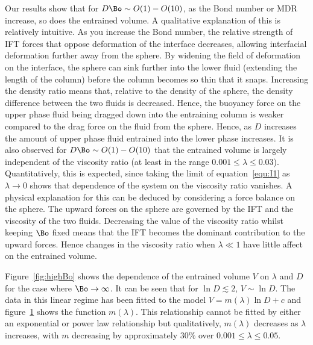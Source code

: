 {Our results show that for $D \Bo \sim O(1) - O(10)$, as the Bond number or MDR increase, so does the entrained volume. A qualitative explanation of this is relatively intuitive. As you increase the Bond number, the relative strength of IFT forces that oppose deformation of the interface decreases, allowing interfacial deformation further away from the sphere. By widening the field of deformation on the interface, the sphere can sink further into the lower fluid (extending the length of the column) before the column becomes so thin that it snaps. Increasing the density ratio means that, relative to the density of the sphere, the density difference between the two fluids is decreased. Hence, the buoyancy force on the upper phase fluid being dragged down into the entraining column is weaker compared to the drag force on the fluid from the sphere. Hence, as $D$ increases the amount of upper phase fluid entrained into the lower phase increases. It is also observed for $D \Bo \sim O(1) - O(10)$ that the entrained volume is largely independent of the viscosity ratio (at least in the range $0.001 \leq \lambda \leq 0.03$). Quantitatively, this is expected, since taking the limit of equation~\ref{equ:I1} as $\lambda \to 0$ shows that dependence of the system on the viscosity ratio vanishes. A physical explanation for this can be deduced by considering a force balance on the sphere. The upward forces on the sphere are governed by the IFT and the viscosity of the two fluids. Decreasing the value of the viscosity ratio whilst keeping $\Bo$ fixed means that the IFT becomes the dominant contribution to the upward forces. Hence changes in the viscosity ratio when $\lambda \ll 1$ have little affect on the entrained volume. 

Figure~\ref{fig:highBo} shows the dependence of the entrained volume $V$ on $\lambda$ and $D$ for the case where $\Bo \to \infty$. It can be seen that for $\ln D \lesssim 2$, $V \sim \ln D$. The data in this linear regime has been fitted to the model $V = m(\lambda) \ln D + c$ and figure~\ref{fig:grad} shows the function $m(\lambda)$. This relationship cannot be fitted by either an exponential or power law relationship but qualitatively, $m(\lambda)$ decreases as $\lambda$ increases, with $m$ decreasing by approximately 30\% over $0.001 \leq \lambda \leq 0.05$. 

  \begin{figure}
    \resizebox{0.9\textwidth}{!}{\large }
    \caption{\label{fig:grad}}
  \end{figure}

}
